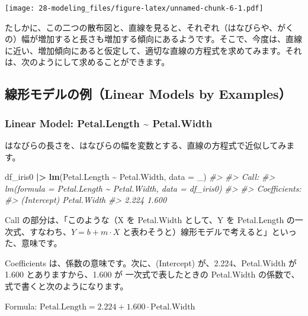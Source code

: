 \documentclass[
  xelatex, ja=standard]{bxjsbook}
\newenvironment{Shaded}{\begin{snugshade}}{\end{snugshade}}
\newcommand{\AttributeTok}[1]{\textcolor[rgb]{0.13,0.29,0.53}{#1}}
\newcommand{\CommentTok}[1]{\textcolor[rgb]{0.56,0.35,0.01}{\textit{#1}}}
\newcommand{\FunctionTok}[1]{\textcolor[rgb]{0.13,0.29,0.53}{\textbf{#1}}}
\newcommand{\NormalTok}[1]{#1}
\newcommand{\SpecialCharTok}[1]{\textcolor[rgb]{0.81,0.36,0.00}{\textbf{#1}}}
\theoremstyle{definition}
\theoremstyle{definition}
\theoremstyle{definition}
\theoremstyle{definition}
\theoremstyle{remark}
\begin{document}
\texttt{[image: 28-modeling\_files/figure-latex/unnamed-chunk-6-1.pdf]}

たしかに、この二つの散布図と、直線を見ると、それぞれ（はなびらや、がくの）幅が増加すると長さも増加する傾向にあるようです。そこで、今度は、直線に近い、増加傾向にあると仮定して、適切な直線の方程式を求めてみます。それは、次のようにして求めることができます。

\hypertarget{ux7ddaux5f62ux30e2ux30c7ux30ebux306eux4f8blinear-models-by-examples}{%
\subsection{線形モデルの例（Linear Models by Examples）}\label{ux7ddaux5f62ux30e2ux30c7ux30ebux306eux4f8blinear-models-by-examples}}

\hypertarget{linear-model-petal.length-petal.width}{%
\subsubsection{Linear Model: Petal.Length \textasciitilde{} Petal.Width}\label{linear-model-petal.length-petal.width}}

はなびらの長さを、はなびらの幅を変数とする、直線の方程式で近似してみます。

\begin{Shaded}
\begin{Highlighting}[]
\NormalTok{df\_iris0 }\SpecialCharTok{|\textgreater{}} \FunctionTok{lm}\NormalTok{(Petal.Length }\SpecialCharTok{\textasciitilde{}}\NormalTok{ Petal.Width, }\AttributeTok{data =}\NormalTok{ \_)}
\CommentTok{\#\textgreater{} }
\CommentTok{\#\textgreater{} Call:}
\CommentTok{\#\textgreater{} lm(formula = Petal.Length \textasciitilde{} Petal.Width, data = df\_iris0)}
\CommentTok{\#\textgreater{} }
\CommentTok{\#\textgreater{} Coefficients:}
\CommentTok{\#\textgreater{} (Intercept)  Petal.Width  }
\CommentTok{\#\textgreater{}       2.224        1.600}
\end{Highlighting}
\end{Shaded}

Call の部分は、「このような（X を Petal.Width として、Y を Petal.Length の一次式、すなわち、\(Y = b + m\cdot X\) と表わそうと）線形モデルで考えると」といった、意味です。

Coefficients は、係数の意味です。次に、(Intercept) が、2.224、Petal.Width が 1.600 とありますから、1.600 が 一次式で表したときの Petal.Width の係数で、式で書くと次のようになります。

Formula: \(\text{Petal.Length} = 2.224 + 1.600\cdot \text{Petal.Width}\)
\end{document}
